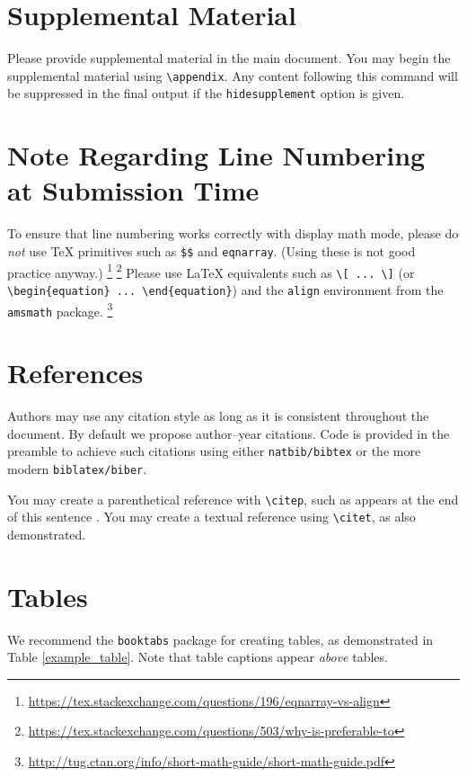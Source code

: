 \documentclass[11pt]{article}
\begin{document}
\section{Supplemental Material}

Please provide supplemental material in the main document. You may begin the
supplemental material using \verb|\appendix|. Any content following this command
will be suppressed in the final output if the \texttt{hidesupplement} option is
given.

\section{Note Regarding Line Numbering at Submission Time}

To ensure that line numbering works correctly with display math mode, please do
\emph{not} use \TeX{} primitives such as \verb|$$| and \texttt{eqnarray}.  (Using
these is not good practice anyway.)%
%
\footnote{\url{https://tex.stackexchange.com/questions/196/eqnarray-vs-align}}%
\footnote{\url{https://tex.stackexchange.com/questions/503/why-is-preferable-to}}
%
Please use \LaTeX{} equivalents such as \verb|\[ ... \]| (or
\verb|\begin{equation} ... \end{equation}|) and the \texttt{align} environment
from the \texttt{amsmath} package.%
%
\footnote{\url{http://tug.ctan.org/info/short-math-guide/short-math-guide.pdf}}

\section{References}

Authors may use any citation style as long as it is consistent throughout the
document. By default we propose author--year citations. Code is provided in the
preamble to achieve such citations using either \texttt{natbib/bibtex} or the
more modern \texttt{biblatex/biber}.

You may create a parenthetical reference with \verb|\citep|, such as appears at
the end of this sentence \citep{example_book}.  You may create a textual
reference using \verb|\citet|, as \citet{example_book} also demonstrated.

\section{Tables}

We recommend the \texttt{booktabs} package for creating tables, as demonstrated
in Table \ref{example_table}. Note that table captions appear \emph{above} tables.
\end{document}
